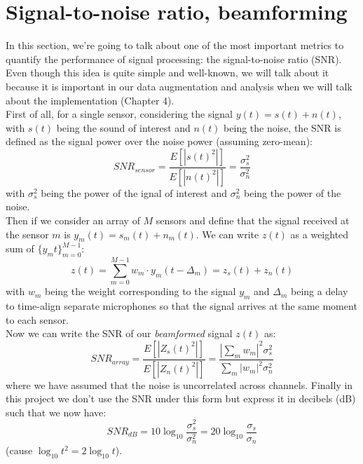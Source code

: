 \documentclass[11pt,a4paper,titlepage]{report}
\begin{document}
\section{Signal-to-noise ratio, beamforming}
\label{sec:Signal processing concepts}
\hspace*{0.6cm}
In this section, we're going to talk about one of the most important metrics to quantify the performance of signal processing: the signal-to-noise ratio (SNR). Even though this idea is quite simple and well-known, we will talk about it because it is important in our data augmentation and analysis when we will talk about the implementation (Chapter 4).\\
\hspace*{0.6cm}
First of all, for a single sensor, considering the signal $ y(t) = s(t) + n(t) $, with $ s(t) $ being the sound of interest and $ n(t) $ being the noise, the SNR is defined as the signal power over the noise power (assuming zero-mean):
\begin{equation}
SNR_{sensor} = \dfrac{E[|s(t)^2|]}{E[|n(t)^2|]} = \dfrac{\sigma_{s}^2}{\sigma_{n}^2} 
\end{equation}
with $\sigma_{s}^2$ being the power of the ignal of interest and $\sigma_{n}^2$ being the power of the noise.\\
Then if we consider an array of $ M $ sensors and define that the signal received at the sensor $ m $ is $ y_{m}(t) = s_{m}(t) + n_{m}(t) $. We can write $ z(t) $ as a weighted sum of $ \{y_m{t}\}_{m=0}^{M-1} $:
\begin{equation}
z(t) = \sum_{m=0}^{M-1}{w_{m} \cdot y_{m}(t-\Delta_{m})} = z_{s}(t) + z_{n}(t) 
\end{equation}
with $ w_{m} $ being the weight corresponding to the signal $ y_{m} $ and $\Delta_{m}$ being a delay to time-align separate microphones so that the signal arrives at the same moment to each sensor.\\
Now we can write the SNR of our \emph{beamformed} signal $z(t) $ as:
\begin{equation}
SNR_{array} = \dfrac{E[|Z_{s}(t)^2|]}{E[|Z_{n}(t)^2|]} = \dfrac{|\sum_{m}w_{m}|^2 \sigma_{s}^2} {\sum_{m}|w_{m}|^2 \sigma_{n}^2} 
\end{equation}
where we have assumed that the noise is uncorrelated across channels.
\hspace*{0.6cm}
Finally in this project we don't use the SNR under this form but express it in decibels (dB) such that we now have:
\begin{equation}
SNR_{dB} = 10\log_{10}{\dfrac{\sigma_{s}^2}{\sigma_{n}^2}} = 20\log_{10}{\dfrac{\sigma_{s}}{\sigma_{n}}} 
\end{equation}
\hspace*{3.4cm}(cause $\log_{10}{t^2} = 2\log_{10}{t}$).
\end{document}
